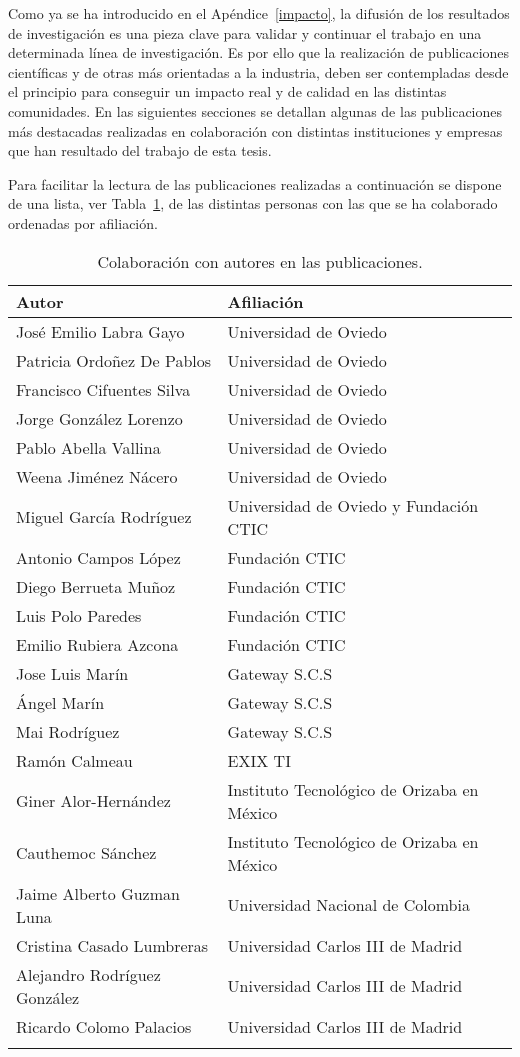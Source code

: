 Como ya se ha introducido en el Apéndice~\ref{impacto}, la difusión de los resultados
de investigación es una pieza clave para validar y continuar el trabajo en una
determinada línea de investigación. Es por ello que la realización de publicaciones
científicas y de otras más orientadas a la industria, deben ser contempladas
desde el principio para conseguir un impacto real y de calidad en las distintas
comunidades. En las siguientes secciones se detallan algunas de las publicaciones
más destacadas realizadas en colaboración con distintas instituciones y empresas 
que han resultado del trabajo de esta tesis.

Para facilitar la lectura de las publicaciones realizadas a continuación 
se dispone de una lista, ver Tabla~\ref{table:publications}, de las distintas personas con las que se ha
colaborado ordenadas por afiliación.

\begin{longtable}[c]{|p{8cm}|p{6cm}|} 
\hline
  \textbf{Autor} & \textbf{Afiliación} \\\hline
\endhead
 José Emilio Labra Gayo & Universidad de Oviedo \\\hline
 Patricia Ordoñez De Pablos & Universidad de Oviedo \\\hline
 Francisco Cifuentes Silva & Universidad de Oviedo \\\hline
 Jorge González Lorenzo & Universidad de Oviedo \\\hline
 Pablo Abella Vallina & Universidad de Oviedo \\\hline
 Weena Jiménez Nácero & Universidad de Oviedo \\\hline
 Miguel García Rodríguez & Universidad de Oviedo y Fundación CTIC\\\hline
 Antonio Campos López & Fundación CTIC\\\hline
 Diego Berrueta Muñoz & Fundación CTIC\\\hline
 Luis Polo Paredes & Fundación CTIC\\\hline
 Emilio Rubiera Azcona & Fundación CTIC\\\hline
 Jose Luis Marín & Gateway S.C.S\\\hline
 Ángel Marín & Gateway S.C.S\\\hline
 Mai Rodríguez & Gateway S.C.S\\\hline
 Ramón Calmeau & EXIX TI\\\hline
 Giner Alor-Hernández & Instituto Tecnológico de Orizaba en México\\\hline
 Cauthemoc Sánchez & Instituto Tecnológico de Orizaba en México\\\hline
 Jaime Alberto Guzman Luna & Universidad Nacional de Colombia\\\hline
 Cristina Casado Lumbreras & Universidad Carlos III de Madrid\\\hline
 Alejandro Rodríguez González & Universidad Carlos III de Madrid\\\hline
 Ricardo Colomo Palacios & Universidad Carlos III de Madrid\\\hline
\hline
\caption{Colaboración con autores en las publicaciones.}\label{table:publications}\\    
\end{longtable}

